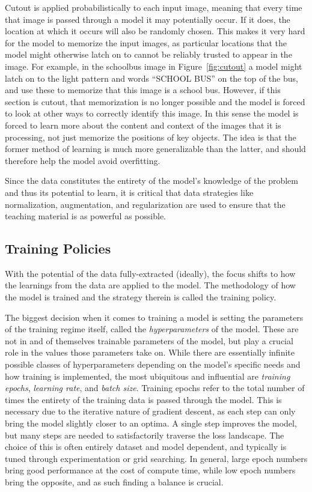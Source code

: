 Cutout is applied probabilistically to each input image, meaning that every time that image is passed through a model it may
potentially occur. If it does, the location at which it occurs will also be randomly chosen. This makes it very hard for the model
to memorize the input images, as particular locations that the model might otherwise latch on to cannot be
reliably trusted to appear in the image. For example, in the schoolbus image in Figure~\ref{fig:cutout} a model might
latch on to the light pattern and words ``SCHOOL BUS'' on the top of the bus, and use these to memorize
that this image is a school bus. However, if this section is cutout, that memorization is no longer possible and the model
is forced to look at other ways to correctly identify this image.  In this sense the model is forced to learn more about
the content and context of the images that it is processing, not just memorize the positions of key objects. The idea is that
the former method of learning is much more generalizable than the latter, and should therefore help the model avoid
overfitting.

Since the data constitutes the entirety of the model's knowledge of the problem and thus
its potential to learn, it is critical that data strategies like normalization, augmentation, and regularization are used to
ensure that the teaching material is as powerful as possible.

\subsection{Training Policies}
With the potential of the data fully-extracted (ideally), the focus shifts to how the learnings from the data
are applied to the model. The methodology of how the model is trained and the strategy therein is called the training policy.

The biggest decision when it comes to training a model is setting the parameters of the training regime itself,
called the \textit{hyperparameters} of the model. These are not in and of themselves trainable parameters of the model,
but play a crucial role in the values those parameters take on. While there are essentially infinite possible
classes of hyperparameters depending on the model's specific needs and how training is implemented, the most
ubiquitous and influential are \textit{training epochs}, \textit{learning rate}, and \textit{batch size}.
Training epochs refer to the total number of times the entirety of the training data is passed through the model.
This is necessary due to the iterative nature of gradient descent, as each step can only bring the model
slightly closer to an optima. A single step improves the model, but many steps are needed to satisfactorily traverse
the loss landscape. The choice of this is often entirely dataset and model dependent, and typically is tuned through
experimentation or grid searching. In general, large epoch numbers bring good performance at the cost of compute time,
while low epoch numbers bring the opposite, and as such finding a balance is crucial.


